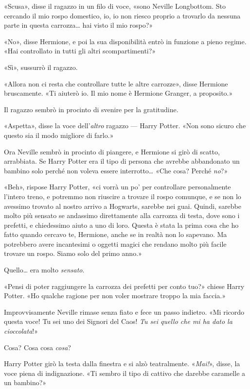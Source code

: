 «Scusa», disse il ragazzo in un filo di voce, «sono Neville Longbottom. Sto cercando il mio rospo domestico, io, io non riesco proprio a trovarlo da nessuna parte in questa carrozza… hai visto il mio rospo?»

«No», disse Hermione, e poi la sua disponibilità entrò in funzione a pieno regime. «Hai controllato in tutti gli altri scompartimenti?»

«Sì», sussurrò il ragazzo.

«Allora non ci resta che controllare tutte le altre carrozze», disse Hermione bruscamente. «Ti aiuterò io. Il mio nome è Hermione Granger, a proposito.»

Il ragazzo sembrò in procinto di svenire per la gratitudine.

«Aspetta», disse la voce dell’\textit{altro} ragazzo — Harry Potter. «Non sono sicuro che questo sia il modo migliore di farlo.»

Ora Neville sembrò in procinto di piangere, e Hermione si girò di scatto, arrabbiata. Se Harry Potter era il tipo di persona che avrebbe abbandonato un bambino solo perché non voleva essere interrotto… «Che cosa? Perché \textit{no}?»

«Beh», rispose Harry Potter, «ci vorrà un po’ per controllare personalmente l’intero treno, e potremmo non riuscire a trovare il rospo comunque, e se non lo avessimo trovato al nostro arrivo a Hogwarts, sarebbe nei guai. Quindi, sarebbe molto più sensato se andassimo direttamente alla carrozza di testa, dove sono i prefetti, e chiedessimo aiuto a uno di loro. Questa è stata la prima cosa che ho fatto quando cercavo te, Hermione, anche se in realtà non lo sapevano. Ma potrebbero avere incantesimi o oggetti magici che rendano molto più facile trovare un rospo. Siamo solo del primo anno.»

Quello… era molto \textit{sensato}.

«Pensi di poter raggiungere la carrozza dei prefetti per conto tuo?» chiese Harry Potter. «Ho qualche ragione per non voler mostrare troppo la mia faccia.»

Improvvisamente Neville rimase senza fiato e fece un passo indietro. «Mi ricordo questa voce! Tu sei uno dei Signori del Caos! \textit{Tu sei quello che mi ha dato la cioccolata}!»

Cosa? Cosa cosa \textit{cosa}?

Harry Potter girò la testa dalla finestra e si alzò teatralmente. «\textit{Mai!}», disse, la voce piena di indignazione. «Ti sembro il tipo di cattivo che darebbe caramelle a un bambino?»

